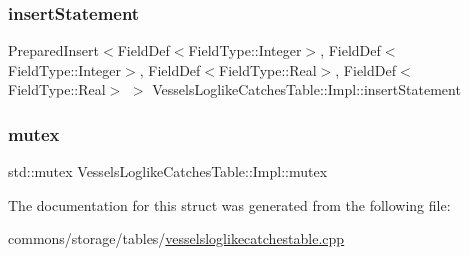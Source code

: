\subsubsection{\texorpdfstring{insertStatement}{insertStatement}}
{\footnotesize\ttfamily Prepared\+Insert$<$Field\+Def$<$Field\+Type\+::\+Integer$>$, Field\+Def$<$Field\+Type\+::\+Integer$>$, Field\+Def$<$Field\+Type\+::\+Real$>$, Field\+Def$<$Field\+Type\+::\+Real$>$ $>$ Vessels\+Loglike\+Catches\+Table\+::\+Impl\+::insert\+Statement}

\mbox{\label{struct_vessels_loglike_catches_table_1_1_impl_a9d6d9ae14e6b61a400c57273e5b43920}} 
\subsubsection{\texorpdfstring{mutex}{mutex}}
{\footnotesize\ttfamily std\+::mutex Vessels\+Loglike\+Catches\+Table\+::\+Impl\+::mutex}



The documentation for this struct was generated from the following file\+:\begin{DoxyCompactItemize}
\item 
commons/storage/tables/\mbox{\hyperlink{vesselsloglikecatchestable_8cpp}{vesselsloglikecatchestable.\+cpp}}\end{DoxyCompactItemize}

